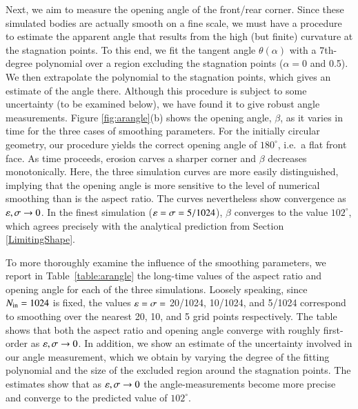 \documentclass[preprint, 10pt]{elsarticle}
\begin{document}
	Next, we aim to measure the opening angle of the front/rear corner. Since these simulated bodies are actually smooth on a fine scale, we must have a procedure to estimate the apparent angle that results from the high (but finite) curvature at the stagnation points. To this end, we fit the tangent angle $\theta(\alpha)$ with a 7th-degree polynomial over a region excluding the stagnation points ($\alpha = 0$ and 0.5). We then extrapolate the polynomial to the stagnation points, which gives an estimate of the angle there. Although this procedure is subject to some uncertainty (to be examined below), we have found it to give robust angle measurements. Figure \ref{fig:arangle}(b) shows the opening angle, $\beta$, as it varies in time for the three cases of smoothing parameters. For the initially circular geometry, our procedure yields the correct opening angle of $180^{\circ}$, i.e.~a flat front face. As time proceeds, erosion carves a sharper corner and $\beta$ decreases monotonically. Here, the three simulation curves are more easily distinguished, implying that the opening angle is more sensitive to the level of numerical smoothing than is the aspect ratio. The curves nevertheless show convergence as $\varepsilon, \sigma \to 0$. In the finest simulation ($\varepsilon = \sigma = 5/1024$), $\beta$ converges to the value $102^{\circ}$, which agrees precisely with the analytical prediction from Section \ref{LimitingShape}. 

	To more thoroughly examine the influence of the smoothing parameters, we report in Table~\ref{table:arangle} the long-time values of the aspect ratio and opening angle for each of the three simulations. Loosely speaking, since $N_{\mathrm{in}} = 1024$ is fixed, the values $\varepsilon = \sigma = $ 20/1024, 10/1024, and 5/1024 correspond to smoothing over the nearest 20, 10, and 5 grid points respectively. The table shows that both the aspect ratio and opening angle converge with roughly first-order as $\varepsilon, \sigma \to 0$. In addition, we show an estimate of the uncertainty involved in our angle measurement, which we obtain by varying the degree of the fitting polynomial and the size of the excluded region around the stagnation points. The estimates show that as $\varepsilon, \sigma \to 0$ the angle-measurements become more precise and converge to the predicted value of $102^{\circ}$.
\end{document}
